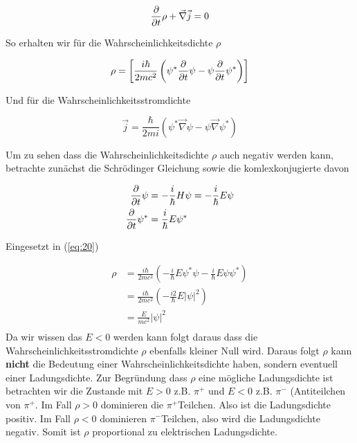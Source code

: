 \begin{equation}
  \label{eq:19}
  \pdiff_t \rho + \vec\nabla\vec j = 0
\end{equation}


So erhalten wir für die Wahrscheinlichkeitsdichte \(\rho\)

\begin{equation}
  \label{eq:20}
  \rho = \left[ \frac{i\hbar}{2mc^2}\left( \psi^* \pdiff_t \psi  -  \psi \pdiff_t\psi^*\right) \right]
\end{equation}

Und für die Wahrscheinlichkeitsstromdichte

\begin{equation}
  \label{eq:21}
  \vec j = \frac{\hbar}{2mi} \left( \psi^* \vec \nabla  \psi  - \psi \vec \nabla \psi^* \right)
\end{equation}


Um zu sehen dass die Wahrscheinlichkeitsdichte \(\rho\) auch negativ werden kann, betrachte zunächst die Schrödinger Gleichung sowie die komlexkonjugierte davon

\begin{align}
  \label{eq:22}
  \pdiff_t \psi &= - \frac{i}{\hbar} H\psi = -  \frac{i}{\hbar} E\psi\\
\pdiff_t \psi^* &= \frac{i}{\hbar} E\psi^*
\end{align}


Eingesetzt in (\ref{eq:20})

\begin{align}
  \label{eq:23}
   \rho &=  \frac{i\hbar}{2mc^2}\left( - \frac{i}{\hbar} E \psi^*\psi   -\frac{i}{\hbar} E  \psi\psi^*   \right) \\
&= \frac{i\hbar}{2mc^2}\left( - \frac{i2}{\hbar} E |\psi|^2   \right)  \\
&= \frac{E}{mc^2}|\psi|^2    \\
\end{align}
Da wir wissen das \(E<0\) werden kann folgt daraus dass die Wahrscheinlichkeitsstromdichte \(\rho\) ebenfalls kleiner Null wird. Daraus folgt \(\rho\) kann \textbf{nicht} die Bedeutung einer Wahrscheinlichkeitsdichte haben, sondern eventuell einer Ladungsdichte. Zur Begründung dass \(\rho\) eine mögliche Ladungsdichte ist betrachten wir die Zustande mit \(E>0\) z.B. \(\pi^+\) und \(E<0\) z.B. \(\pi^-\) (Antiteilchen von \(\pi^+\). Im Fall \(\rho>0\) dominieren die \(\pi^+\)Teilchen. Also ist die Ladungsdichte positiv. Im Fall \(\rho<0\) dominieren \(\pi^-\)Teilchen, also wird die Ladungsdichte negativ. Somit ist \(\rho\) proportional zu elektrischen Ladungsdichte.

